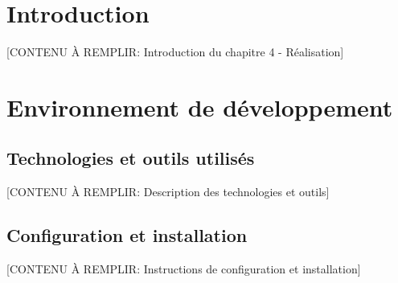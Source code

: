 \section*{Introduction}


[CONTENU À REMPLIR: Introduction du chapitre 4 - Réalisation]

\section{Environnement de développement}


\subsection{Technologies et outils utilisés}

[CONTENU À REMPLIR: Description des technologies et outils]


\subsection{Configuration et installation}

[CONTENU À REMPLIR: Instructions de configuration et installation]


